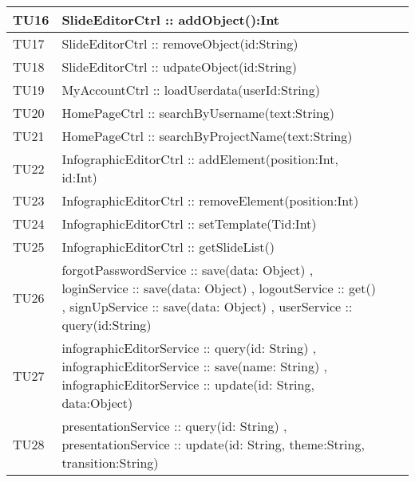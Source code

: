 \begin{table}[H]
\begin{center}
\begin{tabular}{|l|p{}|p{}|c|}

	\toprule
		TU16 & SlideEditorCtrl :: addObject():Int \\
	\midrule
		TU17 & SlideEditorCtrl :: removeObject(id:String) \\
	\midrule
		TU18 & SlideEditorCtrl :: udpateObject(id:String) \\

	\midrule
		TU19 & MyAccountCtrl :: loadUserdata(userId:String) \\
	\midrule
		TU20 & HomePageCtrl :: searchByUsername(text:String) \\
	\midrule
		TU21 & HomePageCtrl :: searchByProjectName(text:String) \\
	\midrule
		TU22 & InfographicEditorCtrl :: addElement(position:Int, id:Int) \\
	\midrule
		TU23 & InfographicEditorCtrl :: removeElement(position:Int) \\
	\midrule
			TU24 & InfographicEditorCtrl :: setTemplate(Tid:Int) \\
			\midrule
			TU25 & InfographicEditorCtrl :: getSlideList() \\
			\midrule
			TU26 & forgotPasswordService ::  save(data: Object) , loginService :: save(data: Object) , logoutService :: get() , signUpService :: save(data: Object) , userService :: query(id:String) \\
			\midrule
			TU27 & infographicEditorService :: query(id: String) , infographicEditorService :: save(name: String) , infographicEditorService :: update(id: String, data:Object) \\
			\midrule
			TU28 & presentationService :: query(id: String) , presentationService :: update(id: String, theme:String, transition:String) \\

\bottomrule

\end{tabular}
\end{center}
\end{table}

